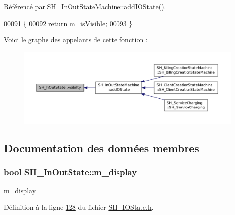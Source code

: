 Référencé par \hyperlink{classSH__InOutStateMachine_ad6b778d052f741daee720c047059ce0e}{S\-H\-\_\-\-In\-Out\-State\-Machine\-::add\-I\-O\-State()}.


\begin{DoxyCode}
00091                                \{
00092     \textcolor{keywordflow}{return} \hyperlink{classSH__InOutState_a8fd66b185c9a55f0e84daa97e2acf53a}{m\_isVisible};
00093 \}
\end{DoxyCode}


Voici le graphe des appelants de cette fonction \-:\nopagebreak
\begin{figure}[H]
\begin{center}
\leavevmode
\includegraphics[width=350pt]{classSH__InOutState_a8c496b2fe21a51a587c6e4409c0f37ec_icgraph}
\end{center}
\end{figure}




\subsection{Documentation des données membres}
\hypertarget{classSH__InOutState_a3351fa53593266a1ae4334d33d0b1610}{
\subsubsection[{m\-\_\-display}]{\setlength{\rightskip}{0pt plus 5cm}bool S\-H\-\_\-\-In\-Out\-State\-::m\-\_\-display\hspace{0.3cm}{\ttfamily [private]}}}\label{classSH__InOutState_a3351fa53593266a1ae4334d33d0b1610}


m\-\_\-display 



Définition à la ligne \hyperlink{SH__IOState_8h_source_l00128}{128} du fichier \hyperlink{SH__IOState_8h_source}{S\-H\-\_\-\-I\-O\-State.\-h}.



